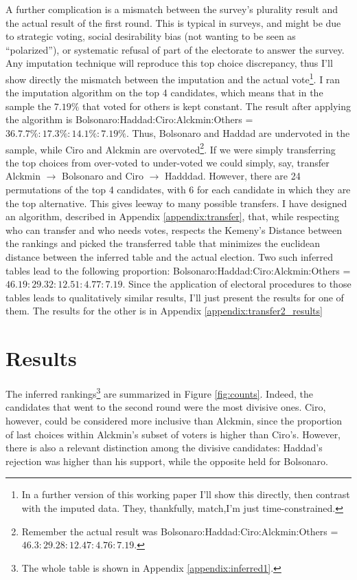 \documentclass[hidelinks,11pt]{article}
\begin{document}
A further complication is a mismatch between the survey's
plurality result and the actual result of the first round. This is typical in
surveys, and might be due to strategic voting, social desirability bias (not
wanting to be seen as ``polarized''), or systematic refusal of part of the electorate
to answer the survey. Any imputation technique will reproduce this top choice discrepancy, thus I'll show directly the mismatch between the
imputation and the actual vote\footnote{In a further version of this working
  paper I'll show this directly, then contrast with the imputed data. They,
  thankfully, match,I'm just time-constrained.}. I ran the imputation algorithm
on the top 4 candidates, which means that in the sample the \(7.19\%\) that
voted for others is kept constant. The result after applying the algorithm is
Bolsonaro:Haddad:Ciro:Alckmin:Others = \(36.7.7\% : 17.3\% : 14.1\% :7.19\% \).
Thus, Bolsonaro and Haddad are undervoted in the sample, while Ciro and Alckmin
are overvoted\footnote{Remember the actual result was
  Bolsonaro:Haddad:Ciro:Alckmin:Others = \(46.3:29.28:12.47:4.76:7.19 \).}. If
we were simply transferring the top choices from over-voted to under-voted we
could simply, say, transfer Alckmin \(\rightarrow\) Bolsonaro and Ciro \(\rightarrow\) Hadddad.
However, there are 24 permutations of the top 4 candidates, with 6 for each
candidate in which they are the top alternative. This gives leeway to many
possible transfers. I have designed an algorithm, described in Appendix
\ref{appendix:transfer}, that, while respecting who can transfer and who needs
votes, respects the Kemeny's Distance between the rankings and picked the
transferred table that minimizes the euclidean distance between the inferred
table and the actual election. Two such inferred tables lead to the following
proportion: Bolsonaro:Haddad:Ciro:Alckmin:Others =
\(46.19:29.32:12.51:4.77:7.19 \). Since the application of electoral procedures
to those tables leads to qualitatively similar results, I'll just present the
results for one of them. The results for the other is in Appendix
\ref{appendix:transfer2_results}

\section{Results}
The inferred rankings\footnote{The whole table is shown in Appendix \ref{appendix:inferred1}.} are summarized in Figure \ref{fig:counts}. Indeed, the candidates that went to the second round were the most divisive ones. Ciro, however, could be considered more inclusive than Alckmin, since the proportion of last choices within Alckmin's subset of voters is higher than Ciro's. However, there is also a relevant distinction among the divisive candidates: Haddad's rejection was higher than his support, while the opposite held for Bolsonaro.
\end{document}
